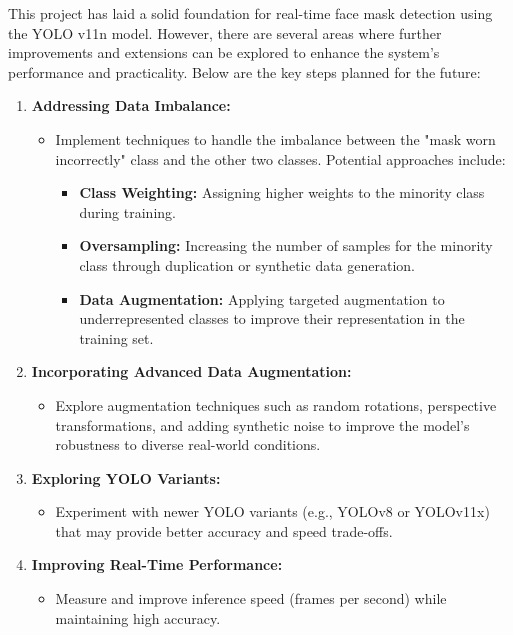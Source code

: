 \documentclass[11pt]{article}
\begin{document}
This project has laid a solid foundation for real-time face mask detection using the YOLO v11n model. However, there are several areas where further improvements and extensions can be explored to enhance the system’s performance and practicality. Below are the key steps planned for the future:

\begin{enumerate}
    \item \textbf{Addressing Data Imbalance:}
    \begin{itemize}
        \item Implement techniques to handle the imbalance between the "mask worn incorrectly" class and the other two classes. Potential approaches include:
        \begin{itemize}
            \item \textbf{Class Weighting:} Assigning higher weights to the minority class during training.
            \item \textbf{Oversampling:} Increasing the number of samples for the minority class through duplication or synthetic data generation.
            \item \textbf{Data Augmentation:} Applying targeted augmentation to underrepresented classes to improve their representation in the training set.
        \end{itemize}
    \end{itemize}

    \item \textbf{Incorporating Advanced Data Augmentation:}
    \begin{itemize}
        \item Explore augmentation techniques such as random rotations, perspective transformations, and adding synthetic noise to improve the model’s robustness to diverse real-world conditions.
    \end{itemize}

    \item \textbf{Exploring YOLO Variants:}
    \begin{itemize}
        \item Experiment with newer YOLO variants (e.g., YOLOv8 or YOLOv11x) that may provide better accuracy and speed trade-offs.
    \end{itemize}

    \item \textbf{Improving Real-Time Performance:}
    \begin{itemize}
        \item Measure and improve inference speed (frames per second) while maintaining high accuracy.
    \end{itemize}


\end{enumerate}
\end{document}
